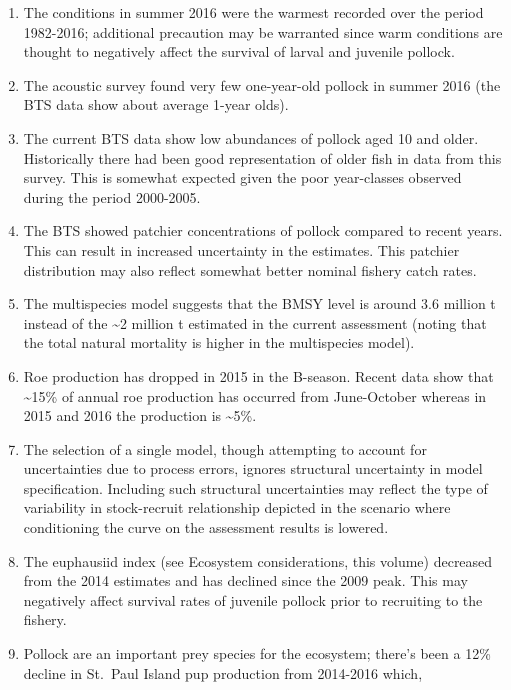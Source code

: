 \begin{enumerate}
\def\labelenumi{\arabic{enumi}.}
\item
  The conditions in summer 2016 were the warmest recorded over the
  period 1982-2016; additional precaution may be warranted since warm
  conditions are thought to negatively affect the survival of larval and
  juvenile pollock.\\
\item
  The acoustic survey found very few one-year-old pollock in summer 2016
  (the BTS data show about average 1-year olds).
\item
  The current BTS data show low abundances of pollock aged 10 and older.
  Historically there had been good representation of older fish in data
  from this survey. This is somewhat expected given the poor
  year-classes observed during the period 2000-2005.
\item
  The BTS showed patchier concentrations of pollock compared to recent
  years. This can result in increased uncertainty in the estimates. This
  patchier distribution may also reflect somewhat better nominal fishery
  catch rates.
\item
  The multispecies model suggests that the BMSY level is around 3.6
  million t instead of the \textasciitilde{}2 million t estimated in the
  current assessment (noting that the total natural mortality is higher
  in the multispecies model).
\item
  Roe production has dropped in 2015 in the B-season. Recent data show
  that \textasciitilde{}15\% of annual roe production has occurred from
  June-October whereas in 2015 and 2016 the production is
  \textasciitilde{}5\%.
\item
  The selection of a single model, though attempting to account for
  uncertainties due to process errors, ignores structural uncertainty in
  model specification. Including such structural uncertainties may
  reflect the type of variability in stock-recruit relationship depicted
  in the scenario where conditioning the curve on the assessment results
  is lowered.
\item
  The euphausiid index (see Ecosystem considerations, this volume)
  decreased from the 2014 estimates and has declined since the 2009
  peak. This may negatively affect survival rates of juvenile pollock
  prior to recruiting to the fishery.
\item
  Pollock are an important prey species for the ecosystem; there's been
  a 12\% decline in St.~Paul Island pup production from 2014-2016 which,

\end{enumerate}
